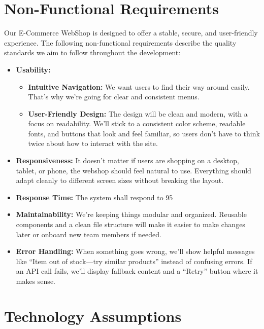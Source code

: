 \documentclass[a4paper,12pt]{article}
\begin{document}
	\section{Non-Functional Requirements}  

Our E-Commerce WebShop is designed to offer a stable, secure, and user-friendly experience. The following non-functional requirements describe the quality standards we aim to follow throughout the development:

\begin{itemize}
    \item \textbf{Usability:}  
    \begin{itemize}
        \item \textbf{Intuitive Navigation:}  
        We want users to find their way around easily. That’s why we’re going for clear and consistent menus.

        \item \textbf{User-Friendly Design:}  
        The design will be clean and modern, with a focus on readability. We’ll stick to a consistent color scheme, readable fonts, and buttons that look and feel familiar, so users don’t have to think twice about how to interact with the site.
    \end{itemize}

    \item \textbf{Responsiveness:}  
    It doesn't matter if users are shopping on a desktop, tablet, or phone, the webshop should feel natural to use. Everything should adapt cleanly to different screen sizes without breaking the layout.

    \item \textbf{Response Time:}  
    The system shall respond to 95%

    \item \textbf{Maintainability:}  
    We’re keeping things modular and organized. Reusable components and a clean file structure will make it easier to make changes later or onboard new team members if needed.

    \item \textbf{Error Handling:}  
        When something goes wrong, we'll show helpful messages like “Item out of stock—try similar products” instead of confusing errors. If an API call fails, we’ll display fallback content and a “Retry” button where it makes sense.
\end{itemize}

\section{Technology Assumptions}
\end{document}
